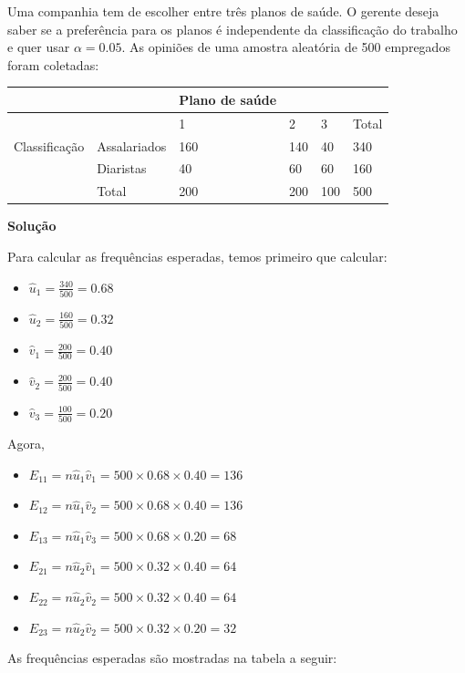 \documentclass[
]{book}
\providecommand{\tightlist}{%
  \setlength{\itemsep}{0pt}\setlength{\parskip}{0pt}}
\begin{document}
Uma companhia tem de escolher entre três planos de saúde. O gerente deseja saber se a preferência para os planos é independente da classificação do trabalho e quer usar \(\alpha=0.05\). As opiniões de uma amostra aleatória de 500 empregados foram coletadas:

\begin{longtable}[]{@{}llllll@{}}
\toprule
& & Plano de saúde & & & \\
\midrule
\endhead
& & 1 & 2 & 3 & Total \\
Classificação & Assalariados & 160 & 140 & 40 & 340 \\
& Diaristas & 40 & 60 & 60 & 160 \\
& Total & 200 & 200 & 100 & 500 \\
\bottomrule
\end{longtable}

\textbf{Solução}

Para calcular as frequências esperadas, temos primeiro que calcular:

\begin{itemize}
\tightlist
\item
  \(\hat u_1=\frac{340}{500}=0.68\)
\item
  \(\hat u_2=\frac{160}{500}=0.32\)
\item
  \(\hat v_1=\frac{200}{500}=0.40\)
\item
  \(\hat v_2=\frac{200}{500}=0.40\)
\item
  \(\hat v_3=\frac{100}{500}=0.20\)
\end{itemize}

Agora,

\begin{itemize}
\tightlist
\item
  \(E_{11} = n \hat u_1 \hat v_1 = 500\times 0.68 \times 0.40 = 136\)
\item
  \(E_{12} = n \hat u_1 \hat v_2 = 500\times 0.68 \times 0.40 = 136\)
\item
  \(E_{13} = n \hat u_1 \hat v_3 = 500\times 0.68 \times 0.20 = 68\)
\item
  \(E_{21} = n \hat u_2 \hat v_1 = 500\times 0.32 \times 0.40 = 64\)
\item
  \(E_{22} = n \hat u_2 \hat v_2 = 500\times 0.32 \times 0.40 = 64\)
\item
  \(E_{23} = n \hat u_2 \hat v_2 = 500\times 0.32 \times 0.20 = 32\)
\end{itemize}

As frequências esperadas são mostradas na tabela a seguir:
\end{document}
